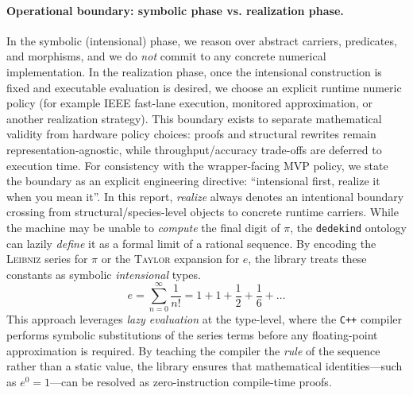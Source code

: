 \documentclass[11pt, a4paper]{report}
\begin{document}
\paragraph{Operational boundary: symbolic phase vs. realization phase.}\label{sec:symbolic-realization-boundary}
In the symbolic (intensional) phase, we reason over abstract carriers, predicates, and morphisms, and we do \emph{not} commit to any concrete numerical implementation.
In the realization phase, once the intensional construction is fixed and executable evaluation is desired, we choose an explicit runtime numeric policy (for example IEEE fast-lane execution, monitored approximation, or another realization strategy).
This boundary exists to separate mathematical validity from hardware policy choices: proofs and structural rewrites remain representation-agnostic, while throughput/accuracy trade-offs are deferred to execution time.
For consistency with the wrapper-facing MVP policy, we state the boundary as an explicit engineering directive: \enquote{intensional first, realize it when you mean it}. In this report, 
\emph{realize} always denotes an intentional boundary crossing from structural/species-level objects to concrete runtime carriers.
While the machine may be unable to \emph{compute} the final digit of $\pi$, the \texttt{dedekind} ontology can lazily \emph{define} it as a formal limit of a rational sequence.
By encoding the \textsc{Leibniz} series for $\pi$ or the \textsc{Taylor} expansion for $e$, the library treats these constants as symbolic \emph{intensional} types.
\begin{equation}
e = \sum_{n=0}^{\infty} \frac{1}{n!} = 1 + 1 + \frac{1}{2} + \frac{1}{6} + \dots
\end{equation}
This approach leverages \emph{lazy evaluation} at the type-level, where the \texttt{C++} compiler performs symbolic substitutions of the series terms before any floating-point approximation is required.
By teaching the compiler the \emph{rule} of the sequence rather than a static value, the library ensures that mathematical identities—such as $e^0 = 1$—can be resolved as zero-instruction compile-time proofs.
\end{document}
